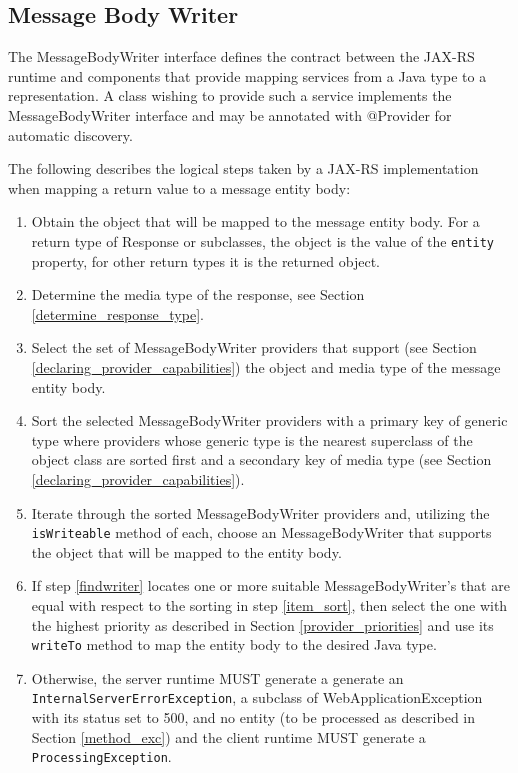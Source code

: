 \subsection{Message Body Writer}
\label{message_body_writer}

The MessageBodyWriter interface defines the contract between the JAX-RS runtime and components that provide mapping
services from a Java type to a representation. A class wishing to provide such a service implements the
MessageBodyWriter interface and may be annotated with @Provider for automatic discovery.

The following describes the logical steps taken by a JAX-RS implementation when mapping a return value to a message
entity body:

\begin{enumerate}
    \item Obtain the object that will be mapped to the message entity body. For a return type of Response or subclasses,
    the object is the value of the \lstinline{entity} property, for other return types it is the returned object.
    \item Determine the media type of the response, see Section \ref{determine_response_type}.
    \item Select the set of MessageBodyWriter providers that support (see Section \ref{declaring_provider_capabilities})
    the object and media type of the message entity body.
    \item\label{item_sort} Sort the selected MessageBodyWriter providers with a primary key of generic type where
    providers whose generic type is the nearest superclass of the object class are sorted first and a secondary key of
    media type (see Section \ref{declaring_provider_capabilities}).
    \item\label{findwriter} Iterate through the sorted MessageBodyWriter providers and, utilizing the
    \lstinline{isWriteable} method of each, choose an MessageBodyWriter that supports the object that will be mapped to
    the entity body.
    \item If step \ref{findwriter} locates one or more suitable MessageBodyWriter's that are equal with respect to the
    sorting in step \ref{item_sort}, then select the one with the highest priority as described in Section
    \ref{provider_priorities} and use its \lstinline{writeTo} method to map the entity body to the desired Java type.
    \item Otherwise, the server runtime MUST generate a generate an \lstinline{InternalServerErrorException}, a subclass
    of WebApplicationException with its status set to 500, and no entity (to be processed as described in Section
    \ref{method_exc}) and the client runtime MUST generate a \lstinline{ProcessingException}.
\end{enumerate}

